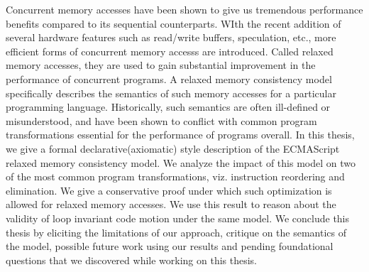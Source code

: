 Concurrent memory accesses have been shown to give us tremendous performance benefits compared to its sequential counterparts.
WIth the recent addition of several hardware features such as read/write buffers, speculation, etc., more efficient forms of concurrent memory accesss are introduced.
Called relaxed memory accesses, they are used to gain substantial improvement in the performance of concurrent programs. 
A relaxed memory consistency model specifically describes the semantics of such memory accesses for a particular programming language. 
Historically, such semantics are often ill-defined or misunderstood, and have been shown to conflict with common program transformations essential for the performance of programs overall. 
In this thesis, we give a formal declarative(axiomatic) style description of the ECMAScript relaxed memory consistency model. 
We analyze the impact of this model on two of the most common program transformations, viz. instruction reordering and elimination. 
We give a conservative proof under which such optimization is allowed for relaxed memory accesses. 
We use this result to reason about the validity of loop invariant code motion under the same model. 
We conclude this thesis by eliciting the limitations of our approach, critique on the semantics of the model, possible future work using our results and pending foundational questions that we discovered while working on this thesis.